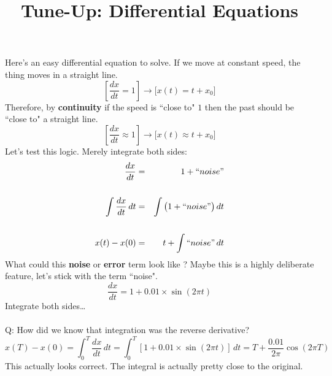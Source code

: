 \documentclass[12pt]{article}
\title{Tune-Up: Differential Equations}
\date{}
\begin{document}
\sffamily

\maketitle

{\fontsize{16pt}{16pt}\selectfont 

\noindent Here's an easy differential equation to solve.  If we move at constant speed, the thing moves in a straight line.
$$ \left[ \frac{dx}{dt} = 1 \right] \to \bigg[ x(t) = t + x_0 \bigg] $$
Therefore, by \textbf{continuity} if the speed is ``close to" $1$ then the past should be ``close to" a straight line.
$$ \left[ \frac{dx}{dt} \approx 1 \right] \to \bigg[ x(t) \approx t + x_0 \bigg] $$
Let's test this logic.  Merely integrate both sides:
\begin{eqnarray*} 
 \frac{dx}{dt} &=& 1 + ``noise" \\ \\
 \int \frac{dx}{dt} \, dt &=& \int \big( 1 + ``noise" \big) \, dt \\ \\
 x(t) - x(0) &=& t + \int ``noise" \, dt
\end{eqnarray*}
What could this \textbf{noise} or \textbf{error} term look like ?  Maybe this is a highly deliberate feature, let's stick with the term ``noise".  
$$ \frac{dx}{dt}  = 1 + 0.01 \times \sin (2\pi t) $$
Integrate both sides\dots \\ \\
Q: How did we know that integration was the reverse derivative?  
$$ x(T) - x(0) = \int_0^T \frac{dx}{dt} \, dt = 
\int_0^T \left[ 1 + 0.01 \times \sin (2\pi t)\right]\,dt = T + \frac{0.01}{2\pi}\cos (2\pi T) $$
This actually looks correct.  The integral is actually pretty close to the original. 

\newpage

}
\end{document}
